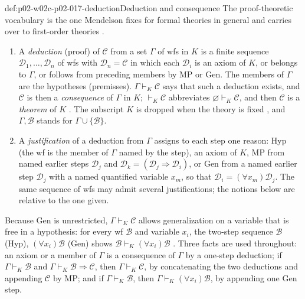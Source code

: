 \begin{hbdefinition}{def:p02-w02c-p02-017-deduction}{Deduction and consequence}
The proof-theoretic vocabulary is the one Mendelson fixes for formal theories
in general and carries over to first-order theories
\cite[\S 1.4, pp.~34--35; \S 2.3, p.~69]{Mendelson1997}.
\begin{enumerate}
  \item A \emph{deduction} (proof) of \(\mathscr C\) from a set \(\Gamma\) of
        wfs in \(K\) is a finite sequence \(\mathscr D_1,\ldots,\mathscr D_n\)
        of wfs with \(\mathscr D_n=\mathscr C\) in which each
        \(\mathscr D_i\) is an axiom of \(K\), or belongs to \(\Gamma\), or
        follows from preceding members by MP or Gen.  The members of
        \(\Gamma\) are the hypotheses (premisses).  \(\Gamma\vdash_K\mathscr C\)
        says that such a deduction exists, and \(\mathscr C\) is then a
        \emph{consequence} of \(\Gamma\) in \(K\); \(\vdash_K\mathscr C\)
        abbreviates \(\varnothing\vdash_K\mathscr C\), and then
        \(\mathscr C\) is a \emph{theorem} of \(K\)
        \cite[\S 1.4, pp.~34--35]{Mendelson1997}.  The subscript \(K\) is
        dropped when the theory is fixed \cite[\S 2.4, p.~71]{Mendelson1997},
        and \(\Gamma,\mathscr B\) stands for \(\Gamma\cup\{\mathscr B\}\).
  \item A \emph{justification} of a deduction from \(\Gamma\) assigns to each
        step one reason: Hyp (the wf is the member of \(\Gamma\) named by the
        step), an axiom of \(K\), MP from named earlier steps
        \(\mathscr D_j\) and \(\mathscr D_k=(\mathscr D_j\Rightarrow
        \mathscr D_i)\), or Gen from a named earlier step \(\mathscr D_j\)
        with a named quantified variable \(x_m\), so that
        \(\mathscr D_i=(\forall x_m)\mathscr D_j\).  The same sequence of wfs
        may admit several justifications; the notions below are relative to
        the one given.
\end{enumerate}
Because Gen is unrestricted, \(\Gamma\vdash_K\mathscr C\) allows
generalization on a variable that is free in a hypothesis: for every wf
\(\mathscr B\) and variable \(x_i\), the two-step sequence \(\mathscr B\)
(Hyp), \((\forall x_i)\mathscr B\) (Gen) shows
\(\mathscr B\vdash_K(\forall x_i)\mathscr B\)
\cite[\S 2.4, p.~73]{Mendelson1997}.  Three facts are used throughout: an
axiom or a member of \(\Gamma\) is a consequence of \(\Gamma\) by a
one-step deduction; if \(\Gamma\vdash_K\mathscr B\) and
\(\Gamma\vdash_K\mathscr B\Rightarrow\mathscr C\), then
\(\Gamma\vdash_K\mathscr C\), by concatenating the two deductions and
appending \(\mathscr C\) by MP; and if \(\Gamma\vdash_K\mathscr B\), then
\(\Gamma\vdash_K(\forall x_i)\mathscr B\), by appending one Gen step.
\end{hbdefinition}

